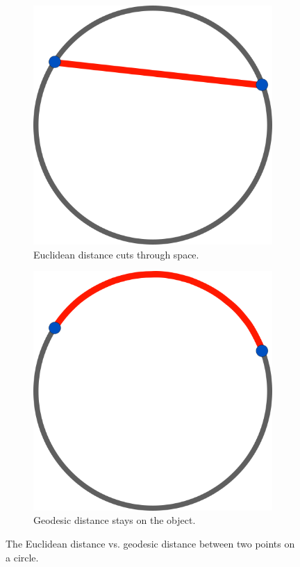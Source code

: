 \documentclass[11pt,a4paper, final, twoside]{article}
\theoremstyle{proposition}
\theoremstyle{definition}
\theoremstyle{remark}
\numberwithin{equation}{section}
\begin{document}
\begin{figure}[h]
\centering
\begin{subfigure}[t]{.5\textwidth}
  \centering
  \includegraphics[width=.5\linewidth]{distancesEuch.png}
  \caption{Euclidean distance cuts through space.}
\end{subfigure}%
\begin{subfigure}[t]{.5\textwidth}
  \centering
  \includegraphics[width=.5\linewidth]{distanceGeo.png}
  \caption{Geodesic distance stays on the object.}
\end{subfigure}
\caption{The Euclidean distance vs. geodesic distance between two points on a circle.}
\label{fig:geodesic}
\end{figure}
\end{document}
